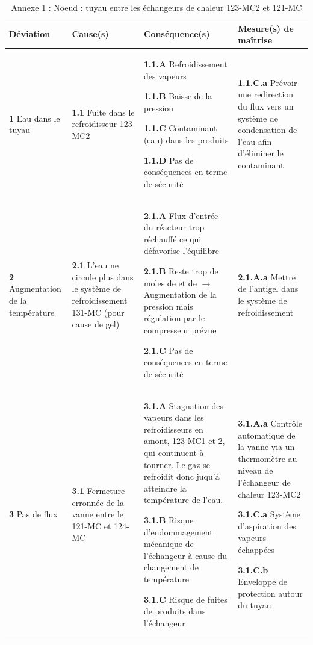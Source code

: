 \begin{table}
\centering
\footnotesize{
\begin{tabular}{|p{}|p{}|p{}|p{}|}
\hline
\textbf{Déviation} & \textbf{Cause(s)} & \textbf{Conséquence(s)} & \textbf{Mesure(s) de maîtrise} \\ \hline \hline
\textbf{1} Eau	dans le tuyau & \textbf{1.1} Fuite dans le refroidisseur 123-MC2 & \textbf{1.1.A}	Refroidissement des vapeurs

\textbf{1.1.B}	Baisse	de la pression

\textbf{1.1.C}	Contaminant	(eau)	dans	les	
produits

\textbf{1.1.D}	 Pas de conséquences en terme de sécurité &
\textbf{1.1.C.a} Prévoir une redirection du flux vers un système de condensation de l’eau afin d’éliminer le contaminant	\\ \hline

\textbf{2} Augmentation de la température & \textbf{2.1} L’eau ne circule plus dans le système de refroidissement 131-MC (pour	cause	de gel) &
\textbf{2.1.A}	Flux d’entrée du réacteur trop réchauffé ce qui défavorise l’équilibre

\textbf{2.1.B}	Reste	trop de moles de \ce{N2} et de \ce{H2} $\rightarrow$ Augmentation de la pression mais régulation par le compresseur prévue

\textbf{2.1.C}	Pas de conséquences en terme de sécurité	
&
\textbf{2.1.A.a} Mettre de l’antigel dans le système de refroidissement \\ \hline
\textbf{3} Pas	de flux & \textbf{3.1} Fermeture erronnée de la vanne entre le 121-MC et 124-MC &
\textbf{3.1.A}	Stagnation des vapeurs dans les refroidisseurs en amont, 123-MC1 et 2, qui continuent à tourner.	
Le gaz se refroidit donc juqu’à atteindre la température de l’eau.

\textbf{3.1.B}	Risque d’endommagement mécanique de l’échangeur à cause du changement de température

\textbf{3.1.C}	Risque de fuites de produits dans l’échangeur &
\textbf{3.1.A.a} Contrôle automatique de la vanne via un thermomètre au niveau de l’échangeur de chaleur 123-MC2

\textbf{3.1.C.a} Système d’aspiration des vapeurs échappées

\textbf{3.1.C.b} Enveloppe de protection autour du tuyau\\ \hline

\end{tabular}
}
\caption{Annexe 1 : Noeud : tuyau entre les échangeurs de chaleur 123-MC2 et 121-MC}
\label{scenarii}
\end{table}

